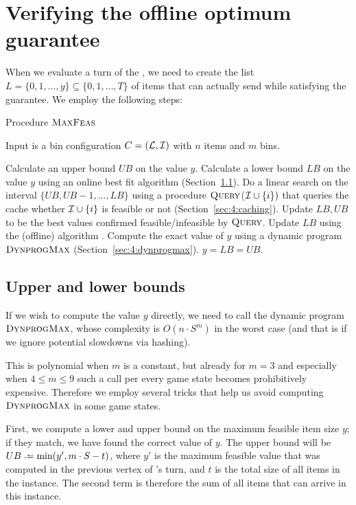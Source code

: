 \section{Verifying the offline optimum guarantee}\label{subsec:test}

When we evaluate a turn of the \adversary, we need to create the list
$L = \{0,1,\ldots,y\} \subseteq \{0,1,\ldots,T\}$ of items that
\adversary can actually send while satisfying the \binstretch
guarantee. We employ the following steps:

\begin{algorithm}
\caption{Procedure $\textsc{MaxFeas}$}
\noindent Input is a bin configuration $C = ({\mathcal L},{\mathcal I})$ with $n$ items and $m$ bins.
\begin{algorithmic}[1]
\State Calculate an upper bound $UB$ on the value $y$.
\State Calculate a lower bound $LB$ on the value $y$ using an online best fit algorithm (Section~\ref{sec:4:dynprogbounds}).
\State Do a linear search on the interval $\{UB,UB-1,\ldots,LB\}$
using a procedure $\textsc{Query}$(${\mathcal I} \cup \{i\})$ that queries the cache
whether ${\mathcal I} \cup \{i\}$ is feasible or not (Section~\ref{sec:4:caching}).
\State Update $LB, UB$ to be the best values confirmed feasible/infeasible by $\textsc{Query}$.
\EndIf
{}
\State Update $LB$ using the (offline) algorithm \bfd.
\EndIf
{}
\State Compute the exact value of $y$ using a dynamic program $\textsc{DynprogMax}$ (Section~\ref{sec:4:dynprogmax}).
\EndIf
\State \Return $y = LB = UB$.
\end{algorithmic}
\end{algorithm}

\subsection{Upper and lower bounds}\label{sec:4:dynprogbounds}

If we wish to compute the value $y$ directly, we need to call the
dynamic program $\textsc{DynprogMax}$, whose complexity is $O(n \cdot S^m)$ in
the worst case (and that is if we ignore potential slowdowns via
hashing).

This is polynomial when $m$ is a constant, but already for $m=3$ and
especially when $4 \le m \le 9$ such a call per every game state
becomes prohibitively expensive. Therefore we employ several tricks
that help us avoid computing $\textsc{DynprogMax}$ in some game states.

First, we compute a lower and upper bound on the maximum feasible item
size $y$; if they match, we have found the correct value of $y$.  The
upper bound will be $UB \defeq \min(y', m\cdot S - t)$, where $y'$ is
the maximum feasible value that was computed in the previous vertex of
\adversary's turn, and $t$ is the total size of all items in the
instance. The second term is therefore the sum of all items that can
arrive in this instance.

